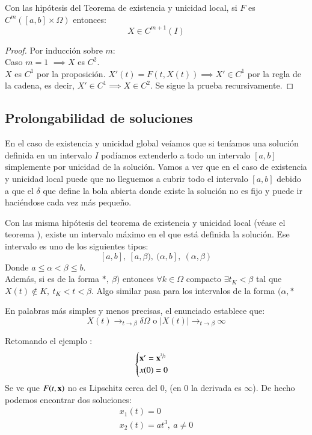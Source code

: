\begin{pro}
    Con las hipótesis del Teorema de existencia y unicidad local, si $F$ es $C^m ([a,b]\times\Omega)$ entonces:
    $$
        X \in C^{m+1}(I)
    $$
\end{pro}
\begin{proof}
    Por inducción sobre $m$:\\
    Caso $m=1$ $\implies X$ es $C^2$.\\
    $X$ es $C^1$ por la proposición. $X'(t) = F(t, X(t)) \implies X' \in C^1$ por la regla de la cadena, es decir, $X' \in C^1 \implies X \in C^2$. Se sigue la prueba recursivamente.
\end{proof}

\subsection{Prolongabilidad de soluciones}
En el caso de existencia y unicidad global veíamos que si teníamos una solución definida en un intervalo $I$ podíamos extenderlo a todo un intervalo $[a, b]$ simplemente por unicidad de la solución. Vamos a ver que en el caso de existencia y unicidad local puede que no lleguemos a cubrir todo el intervalo $[a, b]$ debido a que el $\delta$ que define la bola abierta donde existe la solución no es fijo y puede ir haciéndose cada vez más pequeño.

\begin{pro}
    Con las misma hipótesis del teorema de existencia y unicidad local (véase el teorema \label{thm:exist-unic-local}), existe un intervalo máximo en el que está definida la solución. Ese intervalo es uno de los siguientes tipos:
    $$[a, b],\ [a,\beta),\ (\alpha, b],\ (\alpha, \beta)
    $$
    Donde $a \leq \alpha < \beta \leq b$.\\
    Además, si es de la forma $*,\ \beta)$ entonces $\forall k \in \Omega$ compacto $\exists t_K < \beta$ tal que $X(t)\not \in K,\ t_K < t < \beta$. Algo similar pasa para los intervalos de la forma $(\alpha, *$
\end{pro}
\begin{obs}
    En palabras más simples y menos precisas, el enunciado establece que:
    $$
        X(t) \to_{t\to\beta} \delta \Omega \text{ o } |X(t)| \to_{t\to\beta} \infty
    $$
\end{obs}
\begin{eg}
    Retomando el ejemplo \label{eg:no-unic}:
    $$
        \begin{cases}
            \mathbf{x}' = \mathbf{x}^{\sfrac{2}{3}}\\
            x(0) = 0
        \end{cases}
    $$
    Se ve que $F(t, \mathbf{x})$ no es Lipschitz cerca del $0$, (en $0$ la derivada es $\infty$). De hecho podemos encontrar dos soluciones:
    \begin{gather*}
        x_1(t) = 0\\
        x_2(t) = at^3,\ a \neq 0
    \end{gather*}
\end{eg}

